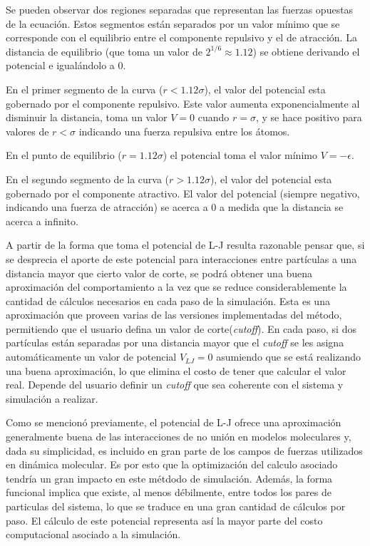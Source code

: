 Se pueden observar dos regiones separadas que representan las fuerzas opuestas de la ecuación. 
Estos segmentos están separados por un valor mínimo que se corresponde con el equilibrio entre el componente repulsivo y el de atracción. 
La distancia de equilibrio (que toma un valor de $2^{1/6}\approx1.12$) se obtiene derivando el potencial e igualándolo a 0.

En el primer segmento de la curva ($r<1.12\sigma$), el valor del potencial esta gobernado por el componente repulsivo. 
Este valor aumenta exponencialmente al disminuir la distancia, toma un valor $V=0$ cuando $r=\sigma$, y se hace positivo para valores de $r<\sigma$ indicando una fuerza repulsiva entre los átomos.

En el punto de equilibrio ($r=1.12\sigma$) el potencial toma el valor mínimo $V=-\epsilon$.

En el segundo segmento de la curva ($r>1.12\sigma$), el valor del potencial esta gobernado por el componente atractivo. El valor del potencial (siempre negativo, indicando una fuerza de atracción) se acerca a 0 a medida que la distancia se acerca a infinito. 


A partir de la forma que toma el potencial de L-J resulta razonable pensar que, si se desprecia el aporte de este potencial para interacciones entre partículas a una distancia mayor que cierto valor de corte, 
se podrá obtener una buena aproximación del comportamiento a la vez que se reduce considerablemente la cantidad de cálculos necesarios en cada paso de la simulación.
Esta es una aproximación que proveen varias de las versiones implementadas del método, permitiendo que el usuario defina un valor de corte(\textit{cutoff}). 
En cada paso, si dos partículas están separadas por una distancia mayor que el \textit{cutoff} se les asigna automáticamente un valor de potencial $V_{LJ}=0$ asumiendo que se está realizando una buena aproximación, 
lo que elimina el costo de tener que calcular el valor real. 
Depende del usuario definir un \textit{cutoff} que sea coherente con el sistema y simulación a realizar.

Como se mencionó previamente, el potencial de L-J ofrece una aproximación generalmente buena de las interacciones de no unión en modelos moleculares y, dada su simplicidad, es incluido en gran parte de los campos de fuerzas utilizados en dinámica molecular.
Es por esto que la optimización del calculo asociado tendría un gran impacto en este métdodo de simulación. 
Además, la forma funcional implica que existe, al menos débilmente, entre todos los pares de particulas del sistema, lo que se traduce en una gran cantidad de cálculos por paso. 
El cálculo de este potencial representa así la mayor parte del costo computacional asociado a la simulación. 


